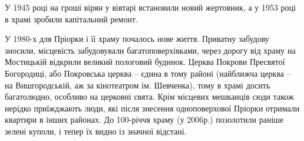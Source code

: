 У 1945 році на гроші вірян у вівтарі встановили новий жертовник, а у 1953 році
в храмі зробили капітальний ремонт.

У 1980-х для Пріорки і її храму почалось нове життя. Приватну забудову зносили,
місцевість забудовували багатоповерхівками, через дорогу від храму на
Мостицькій відкрили великий пологовий будинок. Церква Покрови Пресвятої
Богородиці, або Покровська церква – єдина в тому районі (найближча церква – на
Вишгородській, аж за кінотеатром ім. Шевченка), тому в храмі досить багатолюдно,
особливо на церковні свята. Крім місцевих мешканців сюди також нерідко
приїжджають люди, які після знесення одноповерхової Пріорки отримали квартири в
інших районах. До 100-річчя храму (у 2006р.) позолотили раніше зелені куполи, і
тепер їх видно із значної відстані.

